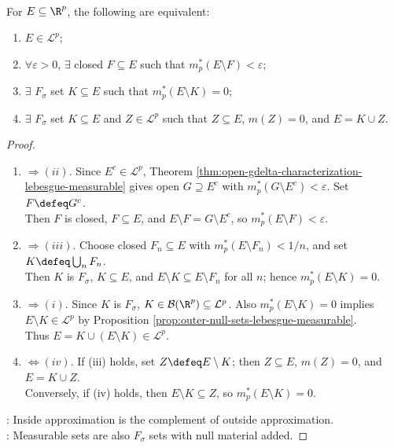 \begin{theorem} \label{thm:closed-fsigma-characterization-lebesgue-measurable} \\
For $E\subseteq\R^p$, the following are equivalent:
\begin{enumerate}[label=(\roman*)]
\setlength{\itemsep}{0pt}
\item $E\in\mathcal{L}^p$;
\item $\forall\varepsilon>0$, $\exists$ closed $F\subseteq E$ such that $m_p^\ast(E\setminus F)<\varepsilon$;
\item $\exists$ $F_\sigma$ set $K\subseteq E$ such that $m_p^\ast(E\setminus K)=0$;
\item $\exists$ $F_\sigma$ set $K\subseteq E$ and $Z\in\mathcal{L}^p$ such that $Z\subseteq E$, $m(Z)=0$, and $E=K\cup Z$.
\end{enumerate}
\begin{proof}
\begin{enumerate}[label=(\roman*)]
\setlength{\itemsep}{0pt}
\item[$(i)$]$\Rightarrow (ii)$. Since $E^c\in\mathcal{L}^p$, Theorem \ref{thm:open-gdelta-characterization-lebesgue-measurable} gives open $G\supseteq E^c$ with $m_p^\ast(G\setminus E^c)<\varepsilon$. Set $F\defeq G^c$.\\
Then $F$ is closed, $F\subseteq E$, and $E\setminus F=G\setminus E^c$, so $m_p^\ast(E\setminus F)<\varepsilon$.
\item[$(ii)$]$\Rightarrow (iii)$. Choose closed $F_n\subseteq E$ with $m_p^\ast(E\setminus F_n)<1/n$, and set $K\defeq\bigcup_nF_n$.\\
Then $K$ is $F_\sigma$, $K\subseteq E$, and $E\setminus K\subseteq E\setminus F_n$ for all $n$; hence $m_p^\ast(E\setminus K)=0$.
\item[$(iii)$]$\Rightarrow (i)$. Since $K$ is $F_\sigma$, $K\in\mathcal{B}(\R^p)\subseteq\mathcal{L}^p$. Also $m_p^\ast(E\setminus K)=0$ implies $E\setminus K\in\mathcal{L}^p$ by Proposition \ref{prop:outer-null-sets-lebesgue-measurable}.\\Thus $E=K\cup(E\setminus K)\in\mathcal{L}^p$.
\item[$(iii)$]$\Leftrightarrow (iv)$. If (iii) holds, set $Z\defeq E\setminus K$; then $Z\subseteq E$, $m(Z)=0$, and $E=K\cup Z$.\\
Conversely, if (iv) holds, then $E\setminus K\subseteq Z$, so $m_p^\ast(E\setminus K)=0$.
\end{enumerate}
: Inside approximation is the complement of outside approximation.\\
: Measurable sets are also $F_\sigma$ sets with null material added.
\end{proof}
\end{theorem}

